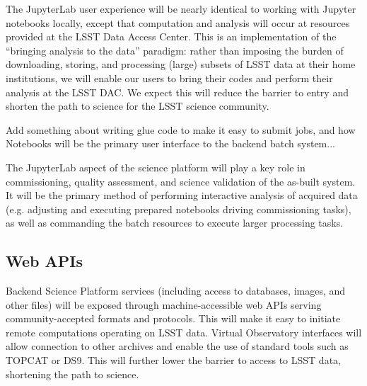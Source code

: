 \documentclass[DM,lsstdraft,toc]{lsstdoc}
\begin{document}
The JupyterLab user experience will be nearly identical to working with
Jupyter notebooks locally, except that computation and analysis will occur
at resources provided at the LSST Data Access Center.  This is an
implementation of the “bringing analysis to the data” paradigm: rather
than imposing the burden of downloading, storing, and processing (large)
subsets of LSST data at their home institutions, we will enable our users to
bring their codes and perform their analysis at the LSST DAC.  We expect
this will reduce the barrier to entry and shorten the path to science for
the LSST science community.

Add something about writing glue code to make it easy to submit jobs,
and how Notebooks will be the primary user interface to the backend batch system...

The JupyterLab aspect of the science platform will play a key role in commissioning,
quality assessment, and science validation of the as-built system. It will be the primary
method of performing interactive analysis of acquired data (e.g. adjusting and executing
prepared notebooks driving commissioning tasks), as well as commanding
the batch resources to execute larger processing tasks.


\subsection{Web APIs}

Backend Science Platform services (including access to
databases, images, and other files) will be exposed through
machine-accessible web APIs serving community-accepted formats and
protocols.  This will make it easy to initiate remote computations operating
on LSST data.  Virtual Observatory interfaces will allow connection to other
archives and enable the use of standard tools such as TOPCAT or DS9. 
This will further lower the barrier to access to LSST data, shortening the
path to science.
\end{document}

